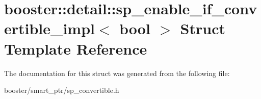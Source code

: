 \section{booster\-:\-:detail\-:\-:sp\-\_\-enable\-\_\-if\-\_\-convertible\-\_\-impl$<$ bool $>$ Struct Template Reference}
\label{structbooster_1_1detail_1_1sp__enable__if__convertible__impl}


The documentation for this struct was generated from the following file\-:\begin{DoxyCompactItemize}
\item 
booster/smart\-\_\-ptr/sp\-\_\-convertible.\-h\end{DoxyCompactItemize}
